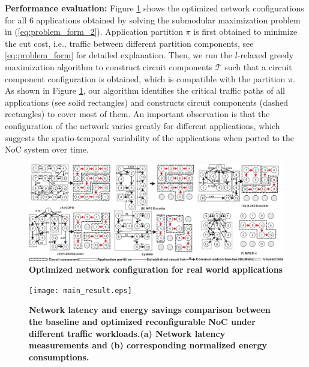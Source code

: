 {{\noindent\textbf{Performance evaluation:} Figure \ref{fig:task} shows the optimized network configurations for all 6 applications obtained by solving the  submodular maximization problem in (\ref{eq:problem_form_2}). Application partition $\pi$ is first obtained to minimize the cut cost, i.e., traffic between different partition components, see \eqref{eq:problem_form} for detailed explanation. Then, we run the $l$-relaxed greedy maximization algorithm to construct circuit components $\mathcal T$ such that a circuit component configuration is obtained, which is compatible with the partition $\pi$. As shown in Figure \ref{fig:task}, our algorithm identifies the critical traffic paths of all applications (see solid rectangles) and constructs circuit components (dashed rectangles) to cover most of them. An important observation is that the configuration of the network varies greatly for different applications, which suggests the spatio-temporal variability of the applications when ported to the NoC system over time. 
\begin{figure}[htb]
  \centering
  \includegraphics[width=1\columnwidth]{task_3.eps}
  \caption{\textbf{Optimized network configuration for real world applications} }
  \label{fig:task}
  \vskip -4mm
\end{figure}
\begin{figure}[htb]
  \centering
  \texttt{[image: main\_result.eps]}
  \vskip -2mm
  \caption{\textbf{Network latency and energy savings comparison between the baseline and optimized reconfigurable NoC under different traffic workloads.(a) Network latency measurements and (b) corresponding normalized energy consumptions. }}

\end{figure}}}
